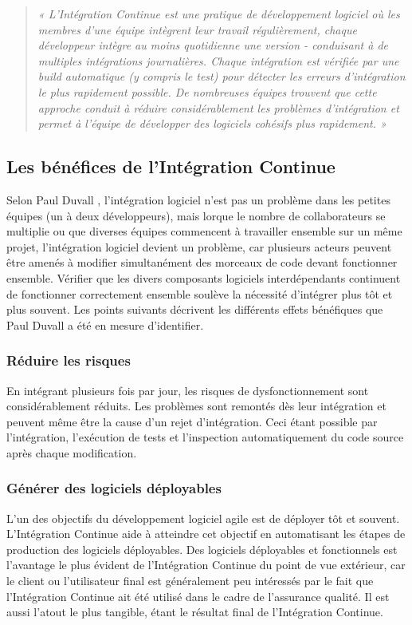   \begin{quotation}
    \emph{« L'Intégration Continue est une pratique de développement logiciel où les membres d'une équipe intègrent leur travail régulièrement, chaque développeur intègre au moins quotidienne une version - conduisant à de multiples intégrations journalières. Chaque intégration est vérifiée par une build automatique (y compris le test) pour détecter les erreurs d'intégration le plus rapidement possible. De nombreuses équipes trouvent que cette approche conduit à réduire considérablement les problèmes d'intégration et permet à l'équipe de développer des logiciels cohésifs plus rapidement. »}\\
  \end{quotation}

    \subsection{Les bénéfices de l’Intégration Continue}
    Selon Paul Duvall \cite{Duv07}, l'intégration logiciel n’est pas un problème dans les petites équipes (un à deux développeurs), mais lorque le nombre de collaborateurs se multiplie ou que diverses équipes commencent à travailler ensemble sur un même projet, l'intégration logiciel devient un problème, car plusieurs acteurs peuvent être amenés à modifier simultanément des morceaux de code devant fonctionner ensemble. Vérifier que les divers composants logiciels interdépendants continuent de fonctionner correctement ensemble soulève la nécessité d'intégrer plus tôt et plus souvent. Les points suivants décrivent les différents effets bénéfiques que Paul Duvall a été en mesure d'identifier.

      \subsubsection{Réduire les risques}
      En intégrant plusieurs fois par jour, les risques de dysfonctionnement sont considérablement réduits. Les problèmes sont remontés dès leur intégration et peuvent même être la cause d’un rejet d’intégration. Ceci étant possible par l’intégration, l’exécution de tests et l’inspection automatiquement du code source après chaque modification.

      \subsubsection{Générer des logiciels déployables}
      L'un des objectifs du développement logiciel agile est de déployer tôt et souvent. L’Intégration Continue aide à atteindre cet objectif en automatisant les étapes de production des logiciels déployables. Des logiciels déployables et fonctionnels est l'avantage le plus évident de l’Intégration Continue du point de vue extérieur, car le client ou l'utilisateur final est généralement peu intéressés par le fait que l’Intégration Continue ait été utilisé dans le cadre de l'assurance qualité. Il est aussi l'atout le plus tangible, étant le résultat final de l’Intégration Continue.


